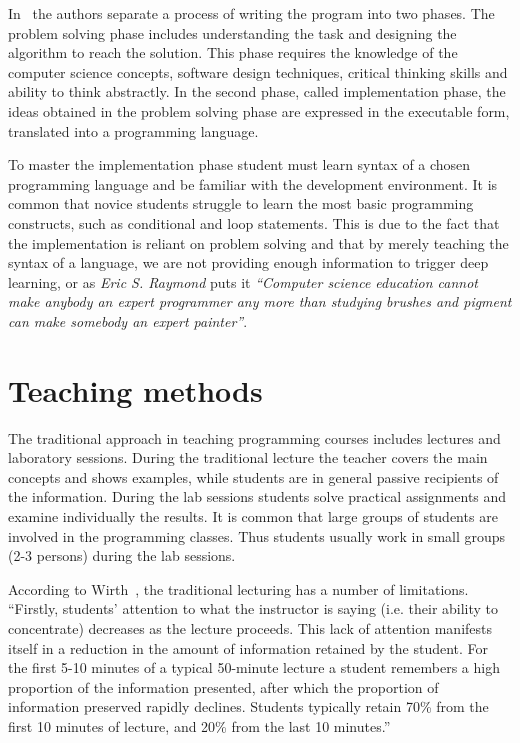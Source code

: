 \documentclass{article}
\begin{document}
In~\cite{state_of_art} the authors separate a process of writing the program
into two phases. The problem solving phase includes understanding the task
and designing the algorithm to reach the solution. This phase requires the
knowledge of the computer science concepts, software design techniques, critical
thinking skills and ability to think abstractly. In the second phase, called
implementation phase, the ideas obtained in the problem solving phase are
expressed in the executable form, translated into a programming language.

To master the implementation phase student must learn syntax of a chosen
programming language and be familiar with the development environment. It is
common that novice students struggle to learn the most basic programming
constructs, such as conditional and loop statements. This is due to the fact
that the implementation is reliant on problem solving and that by merely
teaching the syntax of a language, we are not providing enough information to
trigger deep learning, or as \emph{Eric S. Raymond} puts it 
\emph{``Computer science education cannot make anybody an expert programmer any
more than studying brushes and pigment can make somebody an expert painter''}. 

\section{Teaching methods}

The traditional approach in teaching programming courses includes lectures and
laboratory sessions. During the traditional lecture the teacher covers the
main concepts and shows examples, while students are in general passive
recipients of the information. During the lab sessions students solve practical
assignments and examine individually the results. It is common that large groups
of students are involved in the programming classes. Thus students usually work
in small groups (2-3 persons) during the lab sessions. 

According to Wirth~\cite{wirth}, the traditional lecturing has a number of
limitations.  ``Firstly, students' attention to what the instructor is saying
(i.e. their ability to concentrate) decreases as the lecture proceeds. This lack
of attention manifests itself in a reduction in the amount of information
retained by the student. For the first 5-10 minutes of a typical 50-minute
lecture a student remembers a high proportion of the information presented,
after which the proportion of information preserved rapidly declines. Students
typically retain 70\% from the first 10 minutes of lecture, and 20\% from the
last 10 minutes.''
\end{document}
